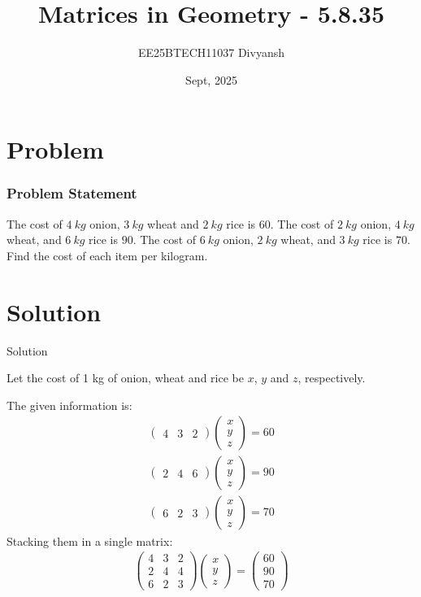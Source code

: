 \documentclass{beamer}
\title{Matrices in Geometry - 5.8.35}
\author{EE25BTECH11037  Divyansh}
\date{Sept, 2025}
\theoremstyle{remark}
\newcommand{\myvec}[1]{\ensuremath{\begin{pmatrix}#1\end{pmatrix}}}
\begin{document}
\maketitle


\section{Problem}
\begin{frame}
\frametitle{Problem Statement}
The cost of $4 \ kg$ onion, $3 \ kg$ wheat and $2\ kg$ rice is \rupee $60$. The cost of $2 \ kg$ onion, $4 \ kg$ wheat, and $6 \ kg$ rice is \rupee $90$. The cost of $6 \ kg$ onion, $2\ kg$ wheat, and $3\ kg$ rice is \rupee $70$. Find the cost of each item per kilogram.
\end{frame}

\section{Solution}
\begin{frame}{Solution}
   
Let the cost of 1 kg of onion, wheat and rice be \rupee $x$, \rupee $y$ and \rupee $z$, respectively.

The given information is:
\begin{align}
    \myvec{4 & 3 & 2}\myvec{x \\ y \\ z}=60 \\
    \myvec{2 & 4 & 6}\myvec{x \\ y \\ z}=90 \\
    \myvec{6 & 2 & 3}\myvec{x \\ y \\ z}=70 
\end{align}
Stacking them in a single matrix:
\begin{align}
    \myvec{4 & 3 & 2 \\ 2 &  4& 4 \\ 6 & 2 & 3}\myvec{x \\ y \\ z}=\myvec{60 \\ 90 \\ 70}
\end{align}
\end{frame}
\end{document}
